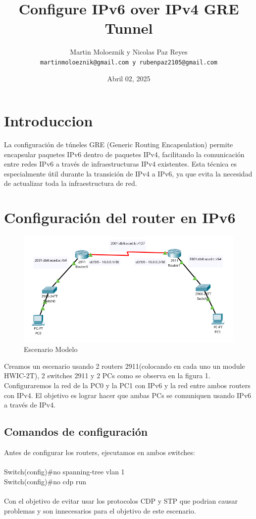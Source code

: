\documentclass[a4paper,12pt]{article}
\title{Configure IPv6 over IPv4 GRE Tunnel}
\author{Martin Moloeznik y Nicolas Paz Reyes\\ \texttt{martinmoloeznik@gmail.com y rubenpaz2105@gmail.com}}
\date{Abril 02, 2025}
\begin{document}
\maketitle

\section{Introduccion}
La configuración de túneles GRE (Generic Routing Encapsulation) permite encapsular paquetes IPv6 dentro de paquetes IPv4, facilitando la comunicación entre redes IPv6 a través de infraestructuras IPv4 existentes. Esta técnica es especialmente útil durante la transición de IPv4 a IPv6, ya que evita la necesidad de actualizar toda la infraestructura de red.
\section{Configuración del router en IPv6}
\begin{figure}[h]
    \centering
    \includegraphics[width=1\textwidth]{imagenes/lab1.png}
    \caption{Escenario Modelo}
  \end{figure}
\FloatBarrier

Creamos un escenario usando 2 routers 2911(colocando en cada uno un module HWIC-2T), 2 switches 2911 y 2 PCs como se observa en la figura 1. Configuraremos la red de la PC0 y la PC1 con IPv6 y la red entre ambos routers con IPv4. El objetivo es lograr hacer que ambas PCs se comuniquen usando IPv6 a través de IPv4.\\
\subsection{Comandos de configuración}
Antes de configurar los routers, ejecutamos en ambos switches:\\
\noindent\\
Switch(config)\#no spanning-tree vlan 1\\
Switch(config)\#no cdp run\\\\
Con el objetivo de evitar usar los protocolos CDP y STP que podrian causar problemas y son innecesarios para el objetivo de este escenario.\\
\end{document}
